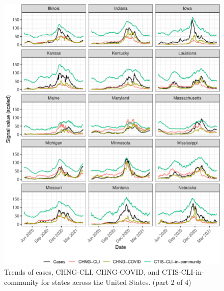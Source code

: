 \clearpage

\begin{figure}

{\centering \includegraphics[width=\textwidth]{fig/state-trend-grids-2-1}

}

\caption{Trends of cases, CHNG-CLI, CHNG-COVID, and CTIS-CLI-in-community for states across the United States. (part 2 of 4)}\label{fig:state-trend-grids-2}
\end{figure}

\clearpage

